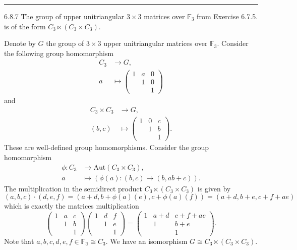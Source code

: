 \documentclass[a4paper, 12pt]{article}
\begin{document}
\noindent\rule{7in}{2.8pt}
\begin{problem}{6.8.7}
The group of upper unitriangular \(3\times 3\) matrices over \(\mathbb{F}_3\) from Exercise 6.7.5. is of the form \(C_3\ltimes (C_3\times C_3)\).
\end{problem}
\begin{solution}
Denote by \(G\) the group of \(3\times 3\) upper unitriangular matrices over \(\mathbb{F}_3\). Consider the following group homomorphism 
\begin{align*}
    C_3&\rightarrow G,\\ 
    a&\mapsto \begin{pmatrix}
        1&a&0\\ 
        &1&0\\ 
        &&1
    \end{pmatrix} 
\end{align*}
and 
\begin{align*}
    C_3\times C_3&\rightarrow G,\\ 
    (b,c)&\mapsto \begin{pmatrix}
        1&0&c\\ 
        &1&b\\ 
        &&1
    \end{pmatrix}. 
\end{align*}
These are well-defined group homomorphisms. Consider the group homomorphism 
\begin{align*}
    \phi:C_3&\rightarrow \text{Aut}(C_3\times C_3),\\ 
         a&\mapsto (\phi(a):(b,c)\rightarrow (b,ab+c)).
\end{align*}
The multiplication in the semidirect product \(C_3\ltimes (C_3\times C_3)\) is given by 
\[(a,b,c)\cdot (d,e,f)=(a+d,b+\phi(a)(e),c+\phi(a)(f))=(a+d,b+e,c+f+ae)\]
which is exactly the matrices multiplication 
\[\begin{pmatrix}
    1&a&c\\ 
    &1&b\\ 
    &&1
\end{pmatrix}\begin{pmatrix}
    1&d&f\\ 
    &1&e\\ 
    &&1
\end{pmatrix}=\begin{pmatrix}
    1&a+d&c+f+ae\\ 
    &1&b+e\\ 
    &&1
\end{pmatrix}.\]
Note that \(a,b,c,d,e,f\in \mathbb{F_3}\cong C_3\). We have an isomorphism \(G\cong C_3\ltimes (C_3\times C_3)\).
\end{solution}
\end{document}
